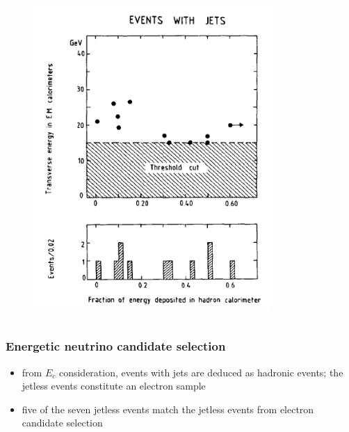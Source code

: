 \documentclass[xcolor=table]{beamer}
\begin{document}
\begin{frame}
\begin{columns}
\begin{figure}[h]
\centering
\includegraphics[width=0.85\textwidth]{images/neutrino-with-jets.png}
\end{figure}


\end{columns}

\end{frame}


\begin{frame}
\frametitle{Energetic neutrino candidate selection}
\fontsize{12pt}{12}\selectfont

\begin{itemize}
\item from $E_c$ consideration, events with jets are deduced as hadronic events; the jetless events constitute an electron sample
\item five of the seven jetless events match the jetless events from electron candidate selection
\end{itemize}


\end{frame}

\end{document}
